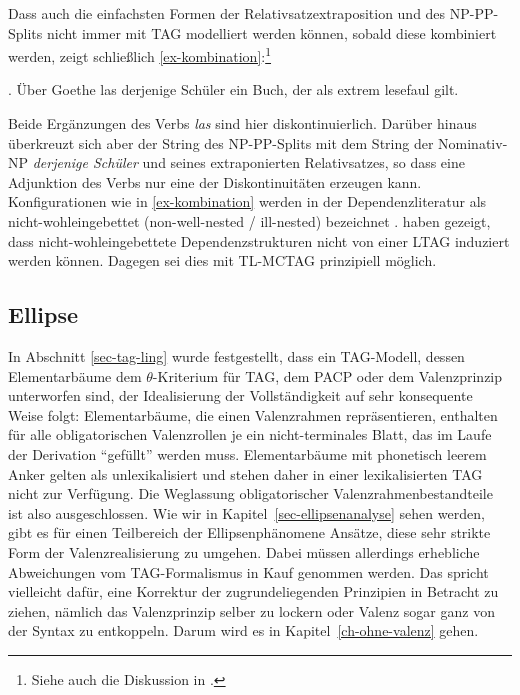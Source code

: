 Dass auch die einfachsten Formen der Relativsatzextraposition und des NP-PP-Splits nicht immer  mit TAG modelliert werden können, sobald diese kombiniert werden, zeigt schlie\ss lich \ref{ex-kombination}:\footnote{Siehe auch die Diskussion in \cite{Chen-Main:Joshi:12}.}

\ex. \label{ex-kombination} Über Goethe las derjenige Schüler ein Buch, der als extrem lesefaul gilt. 

Beide Ergänzungen des Verbs {\it las} sind hier diskontinuierlich. Darüber hinaus überkreuzt sich aber der String des NP-PP-Splits mit dem String der Nominativ-NP {\it derjenige Schüler} und seines extraponierten Relativsatzes, so dass eine Adjunktion des Verbs nur eine der Diskontinuitäten erzeugen kann. Konfigurationen wie in \ref{ex-kombination} werden in der Dependenzliteratur als nicht-wohleingebettet (non-well-nested / ill-nested) bezeichnet \citep{Bodirsky:etal:05}. \cite{Kuhlmann:Moehl:06} haben gezeigt, dass nicht-wohleingebettete Dependenzstrukturen nicht von einer LTAG induziert werden können. Dagegen sei dies mit TL-MCTAG prinzipiell möglich.



\subsection{Ellipse}

In Abschnitt \ref{sec-tag-ling} wurde festgestellt, dass ein TAG-Modell, dessen Elementarbäume dem $\theta$-Kriterium für TAG, dem PACP oder dem Valenzprinzip unterworfen sind, der Idealisierung der Vollständigkeit auf sehr konsequente Weise folgt: Elementarbäume, die einen Valenzrahmen repräsentieren, enthalten für alle obligatorischen Valenzrollen je ein nicht-terminales Blatt, das im Laufe der Derivation "`gefüllt"' werden muss. Elementarbäume mit phonetisch leerem Anker gelten als unlexikalisiert und stehen daher in einer lexikalisierten TAG nicht zur Verfügung. Die Weglassung obligatorischer Valenzrahmenbestandteile ist also ausgeschlossen. Wie wir in Kapitel~\ref{sec-ellipsenanalyse} sehen werden, gibt es für einen Teilbereich der Ellipsenphänomene Ansätze, diese sehr strikte Form der Valenzrealisierung zu umgehen. Dabei müssen allerdings erhebliche Abweichungen vom TAG-Formalismus in Kauf genommen werden. Das spricht vielleicht dafür, eine Korrektur der zugrundeliegenden Prinzipien in Betracht zu ziehen, nämlich das Valenzprinzip selber zu lockern oder Valenz sogar ganz von der Syntax zu entkoppeln. Darum wird es in Kapitel~\ref{ch-ohne-valenz} gehen. 

